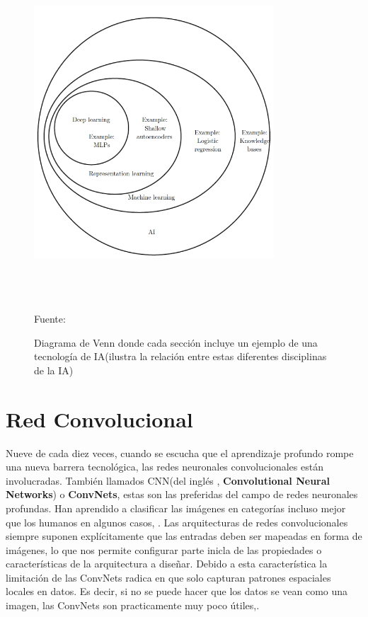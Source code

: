 	\begin{figure}[H]
		\begin{center}
		\includegraphics[width=0.8\textwidth, height=12.5cm]{images/marcoteorico/venn_diag}
		\end{center}
		\begin{center}
		\vskip -0.1cm
		\caption{\small{Diagrama de Venn donde cada sección incluye un ejemplo de una tecnología de IA(ilustra la relación entre estas diferentes disciplinas de la IA)}}
		{\small{Fuente: \citep{Goodfellow-et-al-2016}}}
		\end{center}
		\vspace{-1.5em}
		\end{figure}

\section{Red Convolucional} 

	Nueve de cada diez veces, cuando se escucha que el aprendizaje profundo rompe una nueva barrera tecnológica, las redes neuronales convolucionales están involucradas. También llamados CNN(del inglés , {\bf Convolutional Neural Networks}) o  {\bf ConvNets}, estas son las preferidas del campo de redes neuronales profundas. Han aprendido a clasificar las imágenes en categorías incluso mejor que los humanos en algunos casos, \citep{Rohrer}.
	\vskip 0.4cm  
	Las arquitecturas de redes convolucionales siempre suponen explícitamente que las entradas deben ser mapeadas en forma de imágenes, lo que nos permite configurar parte inicla de las propiedades o características de la arquitectura a diseñar.  Debido a esta característica la limitación de las ConvNets radica en que solo capturan patrones espaciales locales en datos. Es decir, si no se puede hacer que los datos se vean como una imagen, las ConvNets son practicamente muy poco útiles,\citep{Rohrer}.

